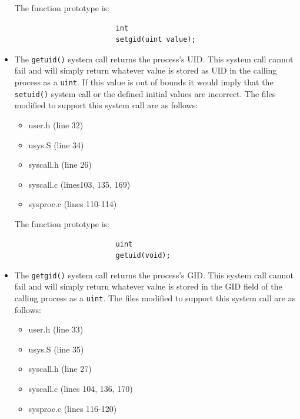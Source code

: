 \documentclass[11pt,letterpaper]{report}
\begin{document}
\begin{itemize}
\begin{itemize}
					\end{itemize}
					
					The function prototype is:
					\begin{verbatim}
						int
						setgid(uint value);
					\end{verbatim}
				
			\item The {\tt getuid()} system call returns the process's UID. This system call cannot fail and will simply return whatever value is stored as UID
				 in the calling process as a {\tt uint}. If this value is out of bounds it would imply that the {\tt setuid()} system call or the defined initial values are incorrect. 
				 The files modified to support this system call are as follows:
				 
					 \begin{itemize}
					
					\item user.h (line 32)
					\item usys.S (line 34)
					\item syscall.h (line 26)
					\item syscall.c (lines103, 135, 169)
					\item sysproc.c (lines 110-114)
					
					\end{itemize}
					
					The function prototype is:
					\begin{verbatim}
						uint
						getuid(void);
					\end{verbatim}
			
			\item The {\tt getgid()} system call returns the process's GID. This system call cannot fail and will simply return whatever value is stored in the GID
				field of the calling process as a {\tt uint}. The files modified to support this system call are as follows:
				 
					 \begin{itemize}
					
					\item user.h (line 33)
					\item usys.S (line 35)
					\item syscall.h (line 27)
					\item syscall.c (lines 104, 136, 170)
					\item sysproc.c (lines 116-120)
					
					\end{itemize}
					

\end{itemize}
\end{document}
